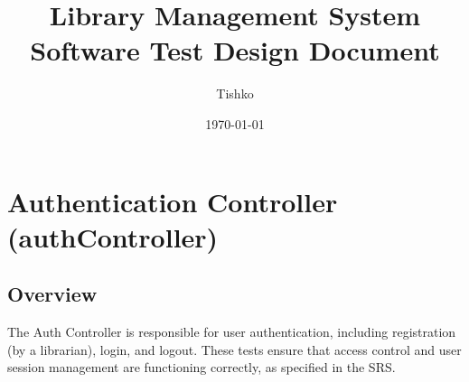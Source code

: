 \documentclass{article}
\begin{document}
\title{
    \textbf{Library Management System}\\
    \large{Software Test Design Document}
}
\author{Tishko}
\date{\today}
\maketitle

\section{Authentication Controller (authController)}
\subsection{Overview}
The Auth Controller is responsible for user authentication, including registration (by a librarian), login, and logout. These tests ensure that access control and user session management are functioning correctly, as specified in the SRS.
\end{document}
